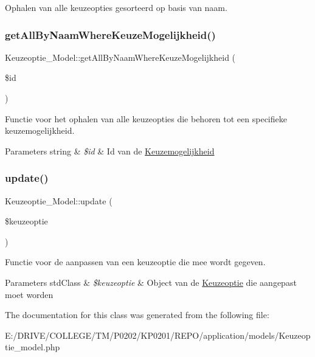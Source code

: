Ophalen van alle keuzeopties gesorteerd op basis van naam. \mbox{\label{class_keuzeoptie___model_af29156c45eb0464a373c6e908982be59}} 
\subsubsection{\texorpdfstring{get\+All\+By\+Naam\+Where\+Keuze\+Mogelijkheid()}{getAllByNaamWhereKeuzeMogelijkheid()}}
{\footnotesize\ttfamily Keuzeoptie\+\_\+\+Model\+::get\+All\+By\+Naam\+Where\+Keuze\+Mogelijkheid (\begin{DoxyParamCaption}\item[{}]{\$id }\end{DoxyParamCaption})}

Functie voor het ophalen van alle keuzeopties die behoren tot een specifieke keuzemogelijkheid. 
\begin{DoxyParams}[1]{Parameters}
string & {\em \$id} & Id van de \mbox{\hyperlink{class_keuzemogelijkheid}{Keuzemogelijkheid}} \\
\hline
\end{DoxyParams}
\mbox{\label{class_keuzeoptie___model_abe363a388f68ec737b0957b748f012d8}} 
\subsubsection{\texorpdfstring{update()}{update()}}
{\footnotesize\ttfamily Keuzeoptie\+\_\+\+Model\+::update (\begin{DoxyParamCaption}\item[{}]{\$keuzeoptie }\end{DoxyParamCaption})}

Functie voor de aanpassen van een keuzeoptie die mee wordt gegeven. 
\begin{DoxyParams}[1]{Parameters}
std\+Class & {\em \$keuzeoptie} & Object van de \mbox{\hyperlink{class_keuzeoptie}{Keuzeoptie}} die aangepast moet worden \\
\hline
\end{DoxyParams}


The documentation for this class was generated from the following file\+:\begin{DoxyCompactItemize}
\item 
E\+:/\+D\+R\+I\+V\+E/\+C\+O\+L\+L\+E\+G\+E/\+T\+M/\+P0202/\+K\+P0201/\+R\+E\+P\+O/application/models/Keuzeoptie\+\_\+model.\+php\end{DoxyCompactItemize}
